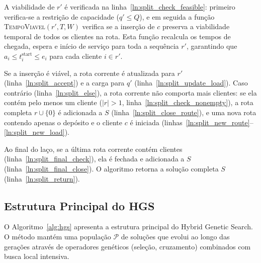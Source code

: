 A viabilidade de $r'$ é verificada na linha~\ref{ln:split_check_feasible}: primeiro verifica-se a restrição de capacidade ($q' \leq Q$), e em seguida a função \textsc{TempoViavel}$(r', T, W)$ verifica se a inserção de $c$ preserva a viabilidade temporal de todos os clientes na rota. Esta função recalcula os tempos de chegada, espera e início de serviço para toda a sequência $r'$, garantindo que $a_i \leq t^{\text{start}}_i \leq e_i$ para cada cliente $i \in r'$.

Se a inserção é viável, a rota corrente é atualizada para $r'$ (linha~\ref{ln:split_accept}) e a carga para $q'$ (linha~\ref{ln:split_update_load}). Caso contrário (linha~\ref{ln:split_else}), a rota corrente não comporta mais clientes: se ela contém pelo menos um cliente ($|r| > 1$, linha~\ref{ln:split_check_nonempty}), a rota completa $r \cup \{0\}$ é adicionada a $S$ (linha~\ref{ln:split_close_route}), e uma nova rota contendo apenas o depósito e o cliente $c$ é iniciada (linhas~\ref{ln:split_new_route}--\ref{ln:split_new_load}).

Ao final do laço, se a última rota corrente contém clientes (linha~\ref{ln:split_final_check}), ela é fechada e adicionada a $S$ (linha~\ref{ln:split_final_close}). O algoritmo retorna a solução completa $S$ (linha~\ref{ln:split_return}).

\subsection{Estrutura Principal do HGS}

O Algoritmo~\ref{alg:hgs} apresenta a estrutura principal do Hybrid Genetic Search. O método mantém uma população $\mathcal{P}$ de soluções que evolui ao longo das gerações através de operadores genéticos (seleção, cruzamento) combinados com busca local intensiva.

